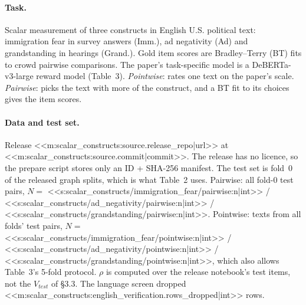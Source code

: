 \paragraph{Task.} Scalar measurement of three constructs in English U.S. political text: immigration fear in survey
answers (Imm.), ad negativity (Ad) and grandstanding in hearings (Grand.). Gold item scores are Bradley--Terry
(BT) fits to crowd pairwise comparisons. The paper's task-specific model is a DeBERTa-v3-large reward model
(Table~3). \emph{Pointwise}: \jev{} rates one text on the paper's scale. \emph{Pairwise}: \jev{} picks the text
with more of the construct, and a BT fit to its choices gives the item scores.

\paragraph{Data and test set.} Release <<m:scalar_constructs:source.release_repo|url>> at
<<m:scalar_constructs:source.commit|commit>>. The release has no licence, so the prepare script stores only an ID + SHA-256 manifest.
The test set is fold~0 of the released graph splits, which is what Table~2 uses. Pairwise: all fold-0 test
pairs, $N=$ <<s:scalar_constructs/immigration_fear/pairwise:n|int>> /
<<s:scalar_constructs/ad_negativity/pairwise:n|int>> / <<s:scalar_constructs/grandstanding/pairwise:n|int>>.
Pointwise: texts from all folds' test pairs, $N=$ <<s:scalar_constructs/immigration_fear/pointwise:n|int>> /
<<s:scalar_constructs/ad_negativity/pointwise:n|int>> / <<s:scalar_constructs/grandstanding/pointwise:n|int>>,
which also allows Table~3's 5-fold protocol. $\rho$ is computed over the release notebook's test items, not the
$V_{test}$ of \S3.3. The language screen dropped
<<m:scalar_constructs:english_verification.rows_dropped|int>> rows.

